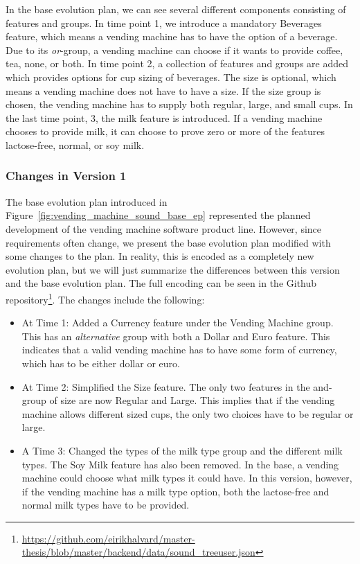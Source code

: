 \documentclass[a4paper,english]{ifimaster}
\begin{document}
In the base evolution plan, we can see several different components consisting of features and groups. In time point 1, we introduce a mandatory Beverages feature, which means a vending machine has to have the option of a beverage. Due to its \textit{or}-group, a vending machine can choose if it wants to provide coffee, tea, none, or both. In time point 2, a collection of features and groups are added which provides options for cup sizing of beverages. The size is optional, which means a vending machine does not have to have a size. If the size group is chosen, the vending machine has to supply both regular, large, and small cups. In the last time point, 3, the milk feature is introduced. If a vending machine chooses to provide milk, it can choose to prove zero or more of the features lactose-free, normal, or soy milk.

\subsubsection{Changes in Version 1}%
\label{ssub:changes_in_version_1}

The base evolution plan introduced in Figure~\vref{fig:vending_machine_sound_base_ep} represented the planned development of the vending machine software product line. However, since requirements often change, we present the base evolution plan modified with some changes to the plan. In reality, this is encoded as a completely new evolution plan, but we will just summarize the differences between this version and the base evolution plan. The full encoding can be seen in the Github repository\footnote{\url{https://github.com/eirikhalvard/master-thesis/blob/master/backend/data/sound\_treeuser.json}}. The changes include the following:

\begin{itemize}
  \item At Time 1: Added a Currency feature under the Vending Machine group. This has an \textit{alternative} group with both a Dollar and Euro feature. This indicates that a valid vending machine has to have some form of currency, which has to be either dollar or euro. 
  \item At Time 2: Simplified the Size feature. The only two features in the and-group of size are now Regular and Large. This implies that if the vending machine allows different sized cups, the only two choices have to be regular or large.
  \item A Time 3: Changed the types of the milk type group and the different milk types. The Soy Milk feature has also been removed. In the base, a vending machine could choose what milk types it could have. In this version, however, if the vending machine has a milk type option, both the lactose-free and normal milk types have to be provided.
\end{itemize}
\end{document}
